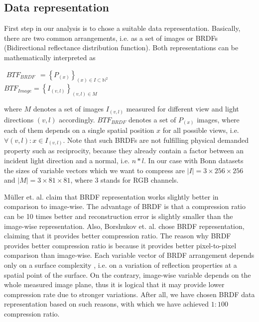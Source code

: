\subsection{Data representation}
\label{section:first_step}

First step in our analysis is to chose a suitable data representation. Basically, there are two common arrangements, i.e. as a set of images or BRDFs (Bidirectional reflectance distribution function). 
Both representations can be mathematically interpreted as  \cite{mueller-2003-compression}


{\centering $\,\,BTF_{BRDF} \;\, = \left \{ {P_{(x)}} \right \}_{(x)\in I\subset \mathbb{N}^{2}}$ \\}
{\centering $BTF_{Image}=\left \{ I_{(v,l)} \right \}_{(v,l)\in M}$\\}

where $M$ denotes a set of images $I_{(v,l)}$ measured for different view and light directions $(v,l)$ accordingly.
$BTF_{BRDF}$ denotes a set of $P_{(x)}$ images, where each of them depends on a single spatial position $x$ for all possible views, i.e. $ \forall (v,l):x \in I_{(v,l)}$.
Note that such BRDFs are not fulfilling physical demanded property such as reciprocity, because they already contain a factor between an incident light direction and a normal, i.e. $n*l$.
In our case with Bonn datasets the sizes of variable vectors which we want to compress are $\left | I \right | = 3\times256\times256$ and $\left | M \right | = 3\times81\times81$, where $3$ stands for RGB channels.


M{\"u}ller et. al. \cite{mueller-2003-compression, haindl} claim that BRDF representation works slightly better in comparison to image-wise. 
The advantage of BRDF is that a compression ratio can be 10 times better and reconstruction error is slightly smaller than the image-wise representation.
Also, Borshukov et. al. \cite[Ch.\ 15]{gpu_gems} chose BRDF representation, claiming that it provides better compression ratio.
The reason why BRDF provides better compression ratio is because it provides better pixel-to-pixel comparison than image-wise. 
Each variable vector of BRDF arrangement depends only on a surface complexity \cite{mueller-2003-compression}, i.e. 
on a variation of reflection properties at a spatial point of the surface.
On the contrary, image-wise variable depends on the whole measured image plane, thus it is logical that it may provide lower compression rate due to stronger variations.
After all, we have chosen BRDF data representation based on such reasons, with which we have achieved $1:100$ compression ratio. 

